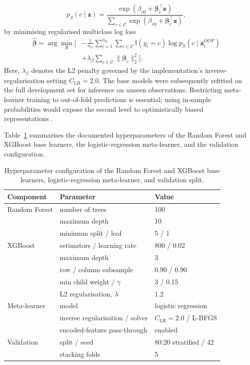\documentclass[a4paper,fleqn]{cas-dc}
\begin{document}
\begin{equation}
p_{S}(c\mid\mathbf{z})=
\frac{\exp(\beta_{c0}+\boldsymbol{\beta}_c^{\top}\mathbf{z})}
{\sum_{r\in\mathcal{C}}\exp(\beta_{r0}+\boldsymbol{\beta}_r^{\top}\mathbf{z})},
\label{eq:meta}
\end{equation}
by minimising regularised multiclass log loss
\begin{equation}
\begin{aligned}
\widehat{\boldsymbol{\beta}}=\arg\min_{\boldsymbol{\beta}}\Biggl[&
-\frac{1}{n_{tr}}\sum_{i=1}^{n_{tr}}\sum_{c\in\mathcal{C}}
\mathbb{I}(y_i=c)\log p_S(c\mid\mathbf{z}^{OOF}_i)\\
&+\lambda_{\beta}\sum_{c\in\mathcal{C}}\lVert\boldsymbol{\beta}_c\rVert_2^2\Biggr].
\end{aligned}
\label{eq:metaloss}
\end{equation}
Here, $\lambda_{\beta}$ denotes the L2 penalty governed by the implementation's inverse-regularisation setting $C_{\mathrm{LR}}=2.0$. The base models were subsequently refitted on the full development set for inference on unseen observations. Restricting meta-learner training to out-of-fold predictions is essential; using in-sample probabilities would expose the second level to optimistically biased representations \cite{kapoor2023,alabi2023}.

Table~\ref{tab:hyper} summarises the documented hyperparameters of the Random Forest and XGBoost base learners, the logistic-regression meta-learner, and the validation configuration.

\begin{table}[width=\textwidth,pos=!tbp]
\centering
\caption{Hyperparameter configuration of the Random Forest and XGBoost base learners, logistic-regression meta-learner, and validation split.}
\label{tab:hyper}
\small
\begin{tabular}{lll}
\toprule
Component & Parameter & Value \\
\midrule
Random Forest & number of trees & 100 \\
 & maximum depth & 10 \\
 & minimum split / leaf & 5 / 1 \\
XGBoost & estimators / learning rate & 800 / 0.02 \\
 & maximum depth & 3 \\
 & row / column subsample & 0.90 / 0.90 \\
 & min child weight / $\gamma$ & 3 / 0.15 \\
 & L2 regularisation, $\lambda$ & 1.2 \\
Meta-learner & model & logistic regression \\
 & inverse regularisation / solver & $C_{\mathrm{LR}}=2.0$ / L-BFGS \\
 & encoded-feature pass-through & enabled \\
Validation & split / seed & 80:20 stratified / 42 \\
 & stacking folds & 5 \\
\bottomrule
\end{tabular}
\end{table}
\end{document}
